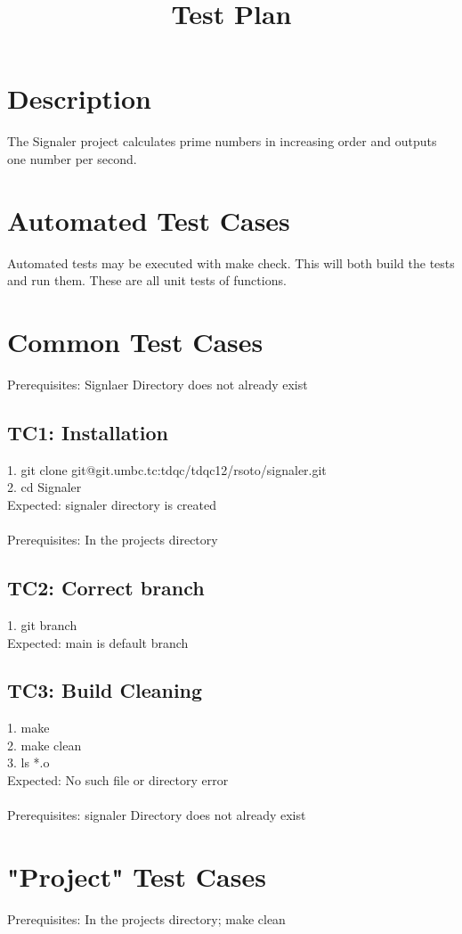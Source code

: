 \documentclass{article}
\title{Test Plan}
\begin{document}
  \maketitle

  \section*{Description}
The Signaler project calculates prime numbers in increasing order and outputs one number per second.

  \section*{Automated Test Cases}
  Automated  tests  may  be  executed  with  make check.  This  will  both  build  the  tests  and  run  them.  These
are all unit tests of functions.

  \section*{Common Test Cases}
  Prerequisites: Signlaer Directory does not already exist
  \subsection*{TC1: Installation}
  1. git clone git@git.umbc.tc:tdqc/tdqc12/rsoto/signaler.git\\
  2. cd Signaler\\
	Expected: signaler directory is created\\
  \\Prerequisites: In the projects directory
  \subsection*{TC2: Correct branch}
  1. git branch\\
Expected: main is default branch\\
  \subsection*{TC3: Build Cleaning}
  1. make\\
2. make clean\\
3. ls *.o\\
Expected: No such file or directory error\\
  \\Prerequisites: signaler Directory does not already exist
  \section*{"Project" Test Cases}
  Prerequisites: In the projects directory; make clean
\end{document}
